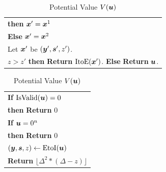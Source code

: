 \documentclass[a4paper,UKenglish]{lipics2}
\theoremstyle{definition}
\def\ite{\mbox{ItoE}}
\def\eti{\mbox{EtoI}}
\def\pot{\mbox{$V$}}
\def\isvalid{\mbox{IsValid}}
\newcommand{\yy}{\mbox{\boldmath $y$}}
\newcommand{\uu}{\mbox{\boldmath $u$}}
\newcommand{\xx}{\mbox{\boldmath $x$}}
\newcommand{\ps}{\mbox{\boldmath $s$}}
\begin{document}
\begin{table}
\begin{minipage}{0.73\textwidth}
\begin{tabular}{|l|}
\hspace{10pt} {\bf then} $\xx'=\xx^1$ \\
\hspace{5pt} {\bf Else} $\xx'=\xx^2$\\
\hspace{0pt}Let $\xx'$ be $(\yy',\ps',z')$. \\
\hspace{0pt}{\bf If} $z>z'$ {\bf then} {\bf Return} $\ite(\xx')$. {\bf Else} {\bf Return} $\uu$.\\
\hline
\end{tabular}
\end{minipage}%
\hspace{-1cm}
\begin{minipage}{0.23\textwidth}
\caption{Potential Value $\pot(\uu)$}\label{tab:F}
\begin{tabular}{|l|}
\hline
\hspace{0pt} {\bf If} $\isvalid(\uu)=0$ \\
\hspace{5pt} {\bf then} {\bf Return} $0$\\
\hspace{0pt} {\bf If} $\uu=0^n$\\
\hspace{5pt}  {\bf then} {\bf Return} $0$\\
\hspace{0pt} $(\yy,\ps,z) \leftarrow \eti(\uu)$\\
\hspace{0pt} {\bf Return} $\lfloor \Delta^2*(\Delta -z)\rfloor$\\
\hline
\end{tabular}
\end{minipage}
\end{table}
\end{document}
